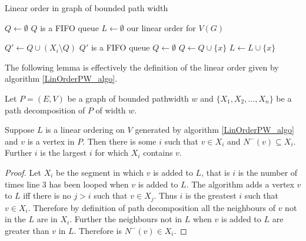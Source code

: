 \begin{algorithm}[h]
    \caption{Linear order in graph of bounded path width}
    \label{LinOrderPW_algo}
    \begin{algorithmic}[1]
        
        \State $Q \gets \emptyset$ \Comment $Q$ is a FIFO queue
        \State $L \gets \emptyset$ \Comment our linear order for $V(G)$
       
            \State $Q' \gets Q \cup (X_i\setminus Q)$ \Comment $Q'$ is a FIFO queue
            \State $Q \gets \emptyset$
                    \State $Q \gets Q\cup \{x\}$
                \Else 
                    \State $L \gets L\cup \{x\}$   
                \EndIf    
        \EndFor
       
        \EndFor 
        
    \end{algorithmic}
\end{algorithm}

The following lemma is effectively the definition of the linear order given by algorithm \ref{LinOrderPW_algo}. 

\begin{lemma} \label{neighboursAfter}
    Let $P=(E,V)$ be a graph of bounded pathwidth $w$ and $\{X_1,X_2,\dots,X_n\}$ be a path decomposition of $P$ of width $w$.
    
    Suppose $L$ is a linear ordering on $V$ generated by algorithm \ref{LinOrderPW_algo} and $v$ is a vertex in $P$. Then there is some $i$ such that $v\in X_i$ and $N^-(v) \subseteq X_i$. Further $i$ is the largest $i$ for which $X_i$ contains $v$. 
\end{lemma}

\begin{proof}
    Let $X_i$ be the segment in which $v$ is added to $L$, that is $i$ is the number of times line 3 has been looped when $v$ is added to $L$.  
    The algorithm adds a vertex $v$ to $L$ iff there is no $j> i$ such that $v \in X_j$. Thus $i$ is the greatest $i$ such that $v \in X_i$. Therefore by definition of path decomposition all the neighbours of $v$ not in the $L$ are in $X_i$. Further the neighbours not in $L$ when $v$ is added to $L$ are greater than $v$ in $L$. Therefore is $N^-(v) \in X_i$.
\end{proof}


